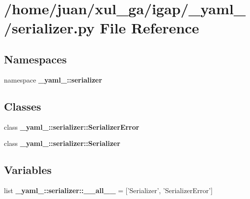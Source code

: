 \section{/home/juan/xul\_\-ga/igap/\_\-yaml\_\-/serializer.py File Reference}
\label{serializer_8py}
\subsection*{Namespaces}
\begin{CompactItemize}
\item 
namespace {\bf \_\-yaml\_\-::serializer}
\end{CompactItemize}
\subsection*{Classes}
\begin{CompactItemize}
\item 
class {\bf \_\-yaml\_\-::serializer::SerializerError}
\item 
class {\bf \_\-yaml\_\-::serializer::Serializer}
\end{CompactItemize}
\subsection*{Variables}
\begin{CompactItemize}
\item 
list {\bf \_\-yaml\_\-::serializer::\_\-\_\-all\_\-\_\-} = ['Serializer', 'SerializerError']
\end{CompactItemize}
